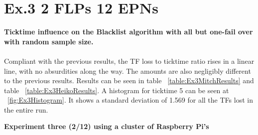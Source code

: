 \newpage

\section{Ex.3 2 FLPs 12 EPNs}
\textbf{Ticktime influence on the Blacklist algorithm with all but one-fail over with random sample size.}
\\~\\
Compliant with the previous results, the TF loss to ticktime ratio rises in a linear line, with no absurdities along the way. The amounts are also negligibly different to the previous results. Results can be seen in table ~\ref{table:Ex3MitchResults} and table ~\ref{table:Ex3HeikoResults}. A histogram for ticktime 5 can be seen at ~\ref{fig:Ex3Histogram}. It shows a standard deviation of 1.569 for all the TFs lost in the entire run. 

\begin{table}[h!]
\caption*{\textbf{Experiment three (2/12) using a cluster of Raspberry Pi's}}
\caption{Cumulative lost TFs by ticktime/EPN ratio with a random sample size for the Blacklist algorithm}
\label{table:Ex3MitchResults}
\end{table}

